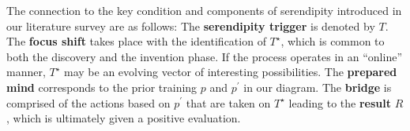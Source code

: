 The connection to the key condition and components of serendipity %
introduced in our literature survey are as follows:
%
The \textbf{serendipity trigger} is denoted by $T$.
%
The \textbf{focus shift} takes place with the identification of
$T^\star$, which is common to both the discovery and the invention
phase.  If the process operates in an ``online'' manner, $T^\star$ may
be an evolving vector of interesting possibilities.
%
The \textbf{prepared mind} corresponds to the prior training $p$ and
$p^{\prime}$ in our diagram.
%
%
The \textbf{bridge} is comprised of the actions based on $p^{\prime}$
that are taken on $T^\star$ leading to the \textbf{result} $R$, which is ultimately given a positive evaluation.

